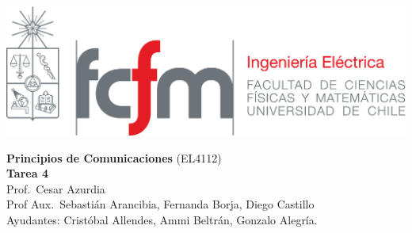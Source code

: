 \documentclass[
  11pt,
  letterpaper,
  answers
]{exam}
\begin{document}
\begin{minipage}{0.42\textwidth}
    \includegraphics[width=\textwidth]{../fcfm_die}
\end{minipage}
\begin{minipage}{0.53\textwidth}
\begin{center} 
\large\textbf{ Principios de Comunicaciones} (EL4112) \\
\large\textbf{Tarea 4} \\
\normalsize Prof.~Cesar Azurdia\\
\normalsize Prof Aux.~Sebastián Arancibia, Fernanda Borja, Diego Castillo\\
\normalsize Ayudantes: Cristóbal Allendes, Ammi Beltrán, Gonzalo Alegría.
\end{center}
\end{minipage}
\end{document}
